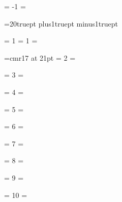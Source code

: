 \pageno = -1
\firstcount=\pageno  %


\baselineskip=20truept plus1truept minus1truept

 \blankpage
 \blankpage

 \blankpage



\reseteqncount       %
\chapnum = 1         %
\pageno = 1
\firstcount=\pageno  %
 \blankpage

\font\antisym=cmr17 at 21pt
\reseteqncount       %
\chapnum = 2         %
\firstcount=\pageno  %
 \blankpage

\reseteqncount       %
\chapnum = 3         %
\firstcount=\pageno  %
 \blankpage

\reseteqncount       %
\chapnum = 4         %
\firstcount=\pageno  %


\reseteqncount       %
\chapnum = 5         %
\firstcount=\pageno  %


\reseteqncount       %
\chapnum = 6         %
\firstcount=\pageno  %
 \blankpage

\reseteqncount       %
\chapnum = 7         %
\firstcount=\pageno  %


\reseteqncount       %
\chapnum = 8         %
\firstcount=\pageno  %


\reseteqncount       %
\chapnum = 9         %
\firstcount=\pageno  %


\reseteqncount       %
\chapnum = 10        %
\firstcount=\pageno  %
 \blankpage

